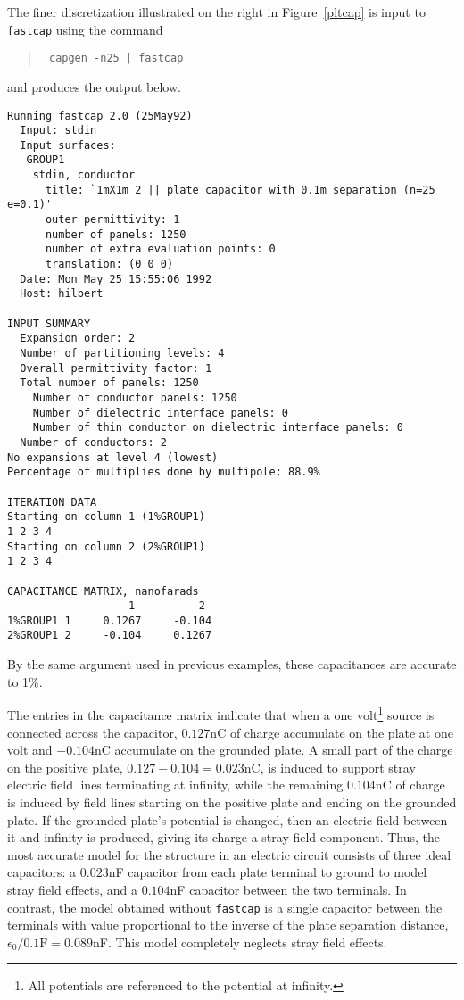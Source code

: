 The finer discretization illustrated  on the right in
Figure~\ref{pltcap} is input
to {\tt fastcap} using the command
\begin{quote}\tt
capgen -n25 | fastcap
\end{quote}
and produces the output below.
\begin{verbatim}
Running fastcap 2.0 (25May92)
  Input: stdin
  Input surfaces:
   GROUP1
    stdin, conductor
      title: `1mX1m 2 || plate capacitor with 0.1m separation (n=25 e=0.1)'
      outer permittivity: 1
      number of panels: 1250
      number of extra evaluation points: 0
      translation: (0 0 0)
  Date: Mon May 25 15:55:06 1992
  Host: hilbert

INPUT SUMMARY
  Expansion order: 2
  Number of partitioning levels: 4
  Overall permittivity factor: 1
  Total number of panels: 1250
    Number of conductor panels: 1250
    Number of dielectric interface panels: 0
    Number of thin conductor on dielectric interface panels: 0
  Number of conductors: 2
No expansions at level 4 (lowest)
Percentage of multiplies done by multipole: 88.9%

ITERATION DATA
Starting on column 1 (1%GROUP1)
1 2 3 4
Starting on column 2 (2%GROUP1)
1 2 3 4

CAPACITANCE MATRIX, nanofarads
                   1          2
1%GROUP1 1     0.1267     -0.104
2%GROUP1 2     -0.104     0.1267
\end{verbatim}
By the same argument used in previous examples, these capacitances
are accurate to 1\%.
%
%

The entries in the capacitance matrix indicate that when a
one volt\footnote{All potentials are referenced to the potential at infinity.}
 source 
is connected across the capacitor, $0.127$nC of charge accumulate on
the plate at one volt and $-0.104$nC accumulate on the grounded plate.
A small part of the charge on the positive plate, $0.127-0.104=0.023$nC,
is induced to support stray electric field lines 
terminating at infinity, while the remaining $0.104$nC of charge
is induced by field lines starting on the positive plate
and ending on the grounded plate. 
If the grounded plate's potential is changed, then an electric field between
it and infinity is produced, giving its charge a stray field
component. Thus, the most accurate model for the structure in an electric
circuit consists of three ideal capacitors: a $0.023$nF capacitor from
each plate terminal to ground to model stray field effects,
and a $0.104$nF capacitor between the two
terminals. In contrast, the model obtained without {\tt fastcap}
is a single capacitor between the terminals with value proportional
to the inverse of the plate separation distance, 
$\epsilon_0/0.1\mbox{F}=0.089$nF. This model completely neglects stray field
effects.

